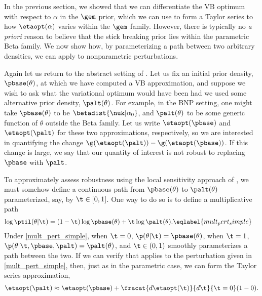 In the previous section, we showed that we can differentiate the VB optimum with
respect to $\alpha$ in the $\gem$ prior, which we can use to form a Taylor
series to how $\etaopt(\alpha)$ varies within the $\gem$ family.  However, there
is typically no {\em a priori} reason to believe that the stick breaking prior
lies within the parametric Beta family.  We now show how, by parameterizing a
path between two arbitrary densities, we can apply  to
nonparametric perturbations.

Again let us return to the abstract setting of . Let us fix an
initial prior density, $\pbase(\theta)$, at which we have computed a VB
approximation, and suppose we wish to ask what the variational optimum would
have been had we used some alternative prior density, $\palt(\theta)$. For
example, in the BNP setting, one might take $\pbase(\theta)$ to be
$\betadist{\nuk \vert \alpha_0}$, and $\palt(\theta)$ to be some generic
function of $\theta$ outside the Beta family. Let us write $\etaopt(\pbase)$ and
$\etaopt(\palt)$ for these two approximations, respectively, so we are
interested in quantifying the change $\g(\etaopt(\palt)) - \g(\etaopt(\pbase))$.
If this change is large, we say that our quantity of interest is not robust to
replacing $\pbase$ with $\palt$.

To approximately assess robustness using the local sensitivity approach of
, we must somehow define a continuous path from
$\pbase(\theta)$ to $\palt(\theta)$ parameterized, say, by $\t \in [0, 1]$. One
way to do so is to define a multiplicative path
%
\begin{align}
%
\log \ptil(\theta \vert \t) ={}&
    (1 - \t)\log \pbase(\theta) + \t \log \palt(\theta).
        \eqlabel{mult_pert_simple}
%
\end{align}
%
Under \eqref{mult_pert_simple}, when $\t=0$, $\p(\theta \vert \t) =
\pbase(\theta)$, when $\t=1$, $\p(\theta \vert \t, \pbase, \palt) =
\palt(\theta)$, and $\t \in (0,1)$ smoothly parameterizes a path between the
two.  If we can verify that  applies to the perturbation
given in \eqref{mult_pert_simple}, then, just as in the parametric case, we can
form the Taylor series approximation,
%
\begin{align*}
%
\etaopt(\palt) \approx
    \etaopt(\pbase) + \fracat{d \etaopt(\t)}{d\t}{\t=0} (1 - 0).
%
\end{align*}

